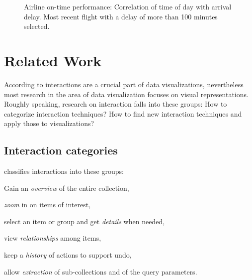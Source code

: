 \documentclass{article}
\begin{document}
\begin{figure}[h]
  \centering
  \caption{Airline on-time performance: Correlation of time of day with arrival delay. Most recent flight with a delay of more than 100 minutes selected.}
  \label{fig:research:cmv}
\end{figure}

\clearpage
\section{Related Work}\label{sec:related-work}
According to \textcite{Ho2013} interactions are a crucial part of data visualizations, nevertheless most research in the area of data visualization focuses on visual representations.
Roughly speaking, research on interaction falls into these groups:
How to categorize interaction techniques?
How to find new interaction techniques and apply those to visualizations?

\subsection{Interaction categories}
\textcite{Shneiderman1996} classifies interactions into these groups:
\begin{enumerate*}[label=(\arabic*)]
  \item
    Gain an \emph{overview} of the entire collection,
  \item
    \emph{zoom} in on items of interest,
  \item
    select an item or group and get \emph{details} when needed,
  \item
    view \emph{relationships} among items,
  \item
    keep a \emph{history} of actions to support undo,
  \item
    allow \emph{extraction} of sub-collections and of the query parameters.
\end{enumerate*}
\end{document}
